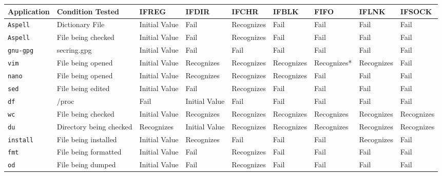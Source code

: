 \begin{table}[t]
    \scriptsize{}
    \begin{tabular}{l  l  |  l  l  l  l  l  l  l}
    \toprule{}
        Application & Condition Tested           & IFREG        & IFDIR        & IFCHR     & IFBLK    & FIFO      & IFLNK    & IFSOCK\\
\hline
        {\tt Aspell}      & Dictionary File            & Initial Value  & Fail           & Recognizes  & Fail       & Fail        & Fail       & Fail\\
        {\tt Aspell}      & File being checked         & Initial Value  & Fail           & Recognizes  & Fail       & Fail        & Fail       & Fail\\
        {\tt gnu-gpg}     & secring.gpg                & Initial Value  & Fail           & Fail        & Fail       & Fail        & Fail       & Fail\\
        {\tt vim}         & File being opened          & Initial Value  & Recognizes     & Recognizes  & Recognizes & Recognizes* & Recognizes & Fail\\
        {\tt nano}        & File being opened          & Initial Value  & Recognizes     & Recognizes  & Recognizes & Fail        & Fail       & Fail\\
        {\tt sed}         & File being edited          & Initial Value  & Fail           & Recognizes  & Fail       & Fail        & Fail       & Fail\\
        {\tt df}          & /proc                      & Fail           & Initial Value  & Fail        & Fail       & Fail        & Fail       & Fail\\
        {\tt wc}          & File being checked         & Initial Value  & Recognizes     & Recognizes  & Recognizes & Recognizes  & Recognizes & Recognizes\\
        {\tt du}          & Directory being checked    & Recognizes     & Initial Value  & Recognizes  & Recognizes & Recognizes  & Recognizes & Recognizes\\
        {\tt install}     & File being installed       & Initial Value  & Recognizes     & Fail       & Fail      & Fail       & Recognizes & Fail\\
        {\tt fmt}         & File being formatted       & Initial Value  & Fail          & Recognizes  & Fail      & Fail       & Fail      & Fail\\
        {\tt od}          & File being dumped          & Initial Value  & Fail          & Recognizes  & Fail      & Fail       & Fail      & Fail\\

\end{tabular}
\end{table}
